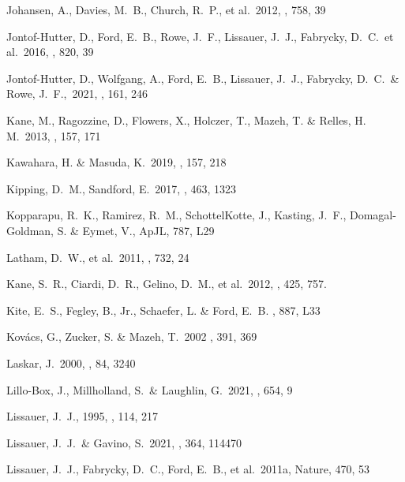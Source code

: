 \documentclass{aastex62}
\begin{document}
\begin{thebibliography}{}
 Johansen, A., Davies, M.~B., Church, R.~P., et al.\ 2012, \apj, 758, 39 %

 Jontof-Hutter, D., Ford, E.~B., Rowe, J.~F., Lissauer, J.~J., Fabrycky, D.~C.~et al.~2016,  \apj, 820, 39

 Jontof-Hutter, D., Wolfgang, A., Ford, E.~B., Lissauer, J.~J., Fabrycky, D.~C.~\& Rowe, J.~F.,~2021,  \aj, 161, 246 

 Kane, M., Ragozzine, D., Flowers, X., Holczer, T., Mazeh, T. \& Relles, H. M.~2013,  \aj, 157, 171

 Kawahara, H. \& Masuda, K.~2019, \aj, 157, 218

 Kipping, D.~M., Sandford, E.~2017, \mnras, 463, 1323

 Kopparapu, R.~K., Ramirez, R.~M., SchottelKotte, J., Kasting, J.~F., Domagal-Goldman, S. \& Eymet, V., ApJL, 787, L29

 Latham, D.~W., et al.\ 2011, \apjl, 732, 24

 Kane, S.~R., Ciardi, D.~R., Gelino, D.~M., et al.\ 2012, \mnras, 425, 757. %

 Kite, E.~S., Fegley, B., Jr., Schaefer, L. \& Ford, E.~B.
\apjl, 887, L33

 Kov{\'a}cs, G.,  {Zucker}, S. \& {Mazeh}, T.~2002 \aap, 391, 369

 Laskar, J.\ 2000, \prl, 84, 3240 %

 Lillo-Box, J., Millholland, S.~\& Laughlin, G.~2021, \aap, 654, 9 

Lissauer, J.~J., 1995,
\icarus, 114, 217

 Lissauer, J.~J.~\& Gavino, S.~2021, \icarus, 364, 114470

Lissauer, J.~J., Fabrycky, D.~C., Ford, E.~B., et al.~2011a,
Nature, 470, 53


\end{thebibliography}
\end{document}

